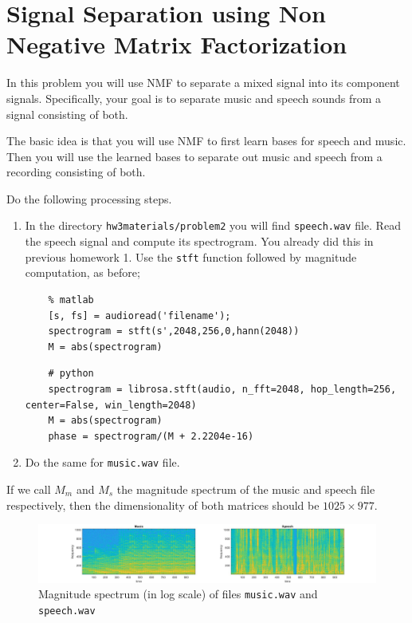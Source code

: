 
\section{Signal Separation using Non Negative Matrix Factorization}

In this problem you will use NMF to separate a mixed signal into its component signals. Specifically, your goal is to separate music and speech sounds from a signal consisting of both.

The basic idea is that you will use NMF to first learn bases for speech and music. Then you will use the learned bases to separate out music and speech from a recording consisting of both.

Do the following processing steps.
\begin{enumerate}
    \item  In the directory \texttt{hw3materials/problem2} you will find \texttt{speech.wav} file. Read the speech signal and compute its spectrogram. You already did this in previous homework 1. Use the \texttt{stft} function followed by magnitude computation, as before;  
    \begin{lstlisting}
    % matlab 
    [s, fs] = audioread('filename');
    spectrogram = stft(s',2048,256,0,hann(2048))
    M = abs(spectrogram)
    \end{lstlisting}
    \begin{lstlisting}
    # python 
    spectrogram = librosa.stft(audio, n_fft=2048, hop_length=256, center=False, win_length=2048)
    M = abs(spectrogram)
    phase = spectrogram/(M + 2.2204e-16)
    \end{lstlisting}
    \item Do the same for \texttt{music.wav} file.
\end{enumerate}
If we call $M_m$ and $M_s$ the magnitude spectrum of the music and speech file respectively, then the dimensionality of both matrices should be $1025 \times 977$. 

\begin{figure}[h!]
    \centering
    \includegraphics[trim ={6cm 0 0 0 }, scale=0.3]{figs/music_speech.jpg}
    \caption{Magnitude spectrum (in log scale) of files \texttt{music.wav} and \texttt{speech.wav}}
    \label{face_example}
\end{figure}


